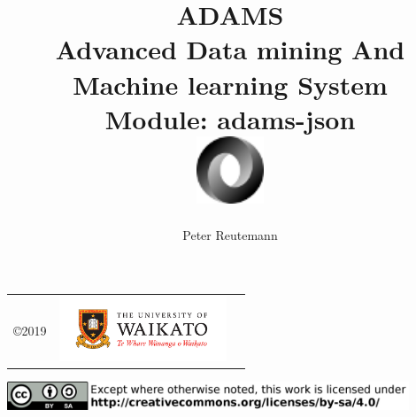 \documentclass[a4paper]{book}
\title{
  \textbf{ADAMS} \\
  {\Large \textbf{A}dvanced \textbf{D}ata mining \textbf{A}nd \textbf{M}achine
  learning \textbf{S}ystem} \\
  {\Large Module: adams-json} \\
  \vspace{1cm}
  \includegraphics[width=2cm]{images/json-module.png} \\
}
\author{
  Peter Reutemann
}
\begin{document}
\begin{titlepage}
\maketitle

\thispagestyle{empty}
\center
\begin{table}[b]
	\begin{tabular}{c l l}
		\parbox[c][2cm]{2cm}{\copyright 2019} &
		\parbox[c][2cm]{5cm}{\includegraphics[width=5cm]{images/coat_of_arms.pdf}} \\
	\end{tabular}
	\includegraphics[width=12cm]{images/cc.png} \\
\end{table}

\end{titlepage}

\tableofcontents

\end{document}
